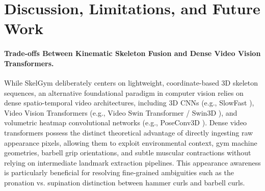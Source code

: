 \documentclass[runningheads]{llncs}
\begin{document}
\section{Discussion, Limitations, and Future Work}

\paragraph{Trade-offs Between Kinematic Skeleton Fusion and Dense Video Vision Transformers.} 
While SkelGym deliberately centers on lightweight, coordinate-based 3D skeleton sequences, an alternative foundational paradigm in computer vision relies on dense spatio-temporal video architectures, including 3D CNNs (e.g., SlowFast \cite{feichtenhofer2019}), Video Vision Transformers (e.g., Video Swin Transformer / Swin3D \cite{liu2022video}), and volumetric heatmap convolutional networks (e.g., PoseConv3D \cite{duan2022}). Dense video transformers possess the distinct theoretical advantage of directly ingesting raw appearance pixels, allowing them to exploit environmental context, gym machine geometries, barbell grip orientations, and subtle muscular contractions without relying on intermediate landmark extraction pipelines. This appearance awareness is particularly beneficial for resolving fine-grained ambiguities such as the pronation vs. supination distinction between hammer curls and barbell curls.
\end{document}

